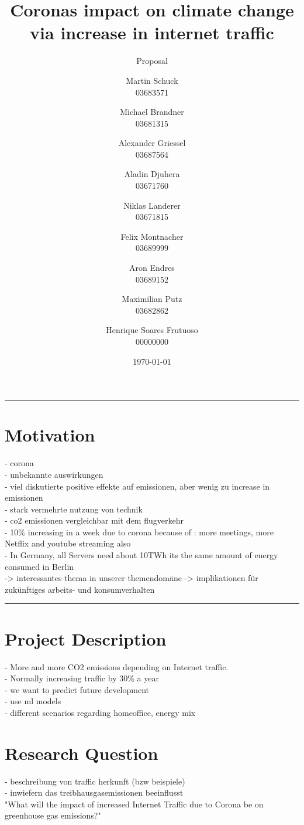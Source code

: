 \documentclass[lang=english,inputenc=utf8,fontsize=10pt]{ldvarticle}
\title{Coronas impact on climate change via increase in internet traffic}
\subtitle{Proposal}
\author{Martin Schuck\\
03683571
\and
Michael Brandner\\
03681315
\and
Alexander Griessel\\
03687564
\and
Aladin Djuhera\\
03671760
\and
Niklas Landerer\\
03671815
\and
Felix Montnacher\\
03689999
\and
Aron Endres\\
03689152
\and
Maximilian Putz\\
03682862
\and
Henrique Soares Frutuoso\\
00000000
}
\date{\today}
\begin{document}
\maketitle
\thispagestyle{empty}

\hrule

\section*{Motivation}

- corona \\
- unbekannte auswirkungen \\
- viel diskutierte positive effekte auf emissionen, aber wenig zu increase in emissionen \\
- stark vermehrte nutzung von technik \\
- co2 emissionen vergleichbar mit dem flugverkehr \\
- 10\% increasing in a week due to corona because of : more meetings, more Netflix and youtube streaming also \\
- In Germany, all Servers need about 10TWh its the same amount of energy consumed in Berlin \\
-> interessantes thema in unserer themendomäne
-> implikationen für zukünftiges arbeits- und konsumverhalten

\vspace*{1cm}
\hrule

\newpage

\section{Project Description}


- More  and more CO2 emissions depending on Internet traffic. \\
- Normally increasing traffic by 30\% a year \\
- we want to predict future development \\
- use ml models \\
- different scenarios regarding homeoffice, energy mix


\section*{Research Question}


- beschreibung von traffic herkunft (bzw beispiele) \\
- inwiefern das treibhausgasemissionen beeinflusst \\
"What will the impact of increased Internet Traffic due to Corona be on greenhouse gas emissions?"
\end{document}
